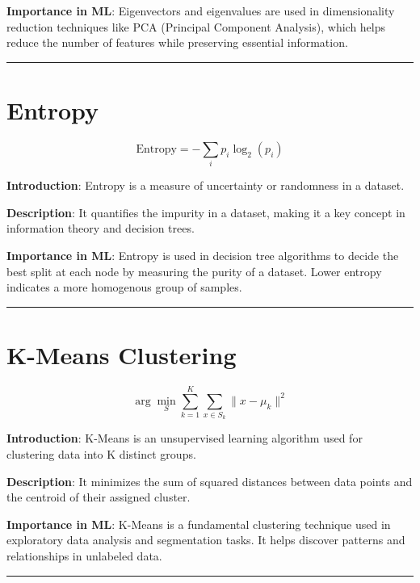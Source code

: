 \documentclass[
  12 pt,
  a4paper,
]{book}
\numberwithin{equation}{section}
\theoremstyle{plain}      %
\theoremstyle{definition} %
\theoremstyle{remark}     %
\theoremstyle{note}         %
\begin{document}
\textbf{Importance in ML}: Eigenvectors and eigenvalues are used in
dimensionality reduction techniques like PCA (Principal Component
Analysis), which helps reduce the number of features while preserving
essential information.

\begin{center}\rule{0.5\linewidth}{0.5pt}\end{center}

\newpage

\hypertarget{entropy}{%
\chapter{Entropy}\label{entropy}}

\[
\text{Entropy} = - \sum_{i} p_i \log_2(p_i)
\]

\textbf{Introduction}: Entropy is a measure of uncertainty or randomness
in a dataset.

\textbf{Description}: It quantifies the impurity in a dataset, making it
a key concept in information theory and decision trees.

\textbf{Importance in ML}: Entropy is used in decision tree algorithms
to decide the best split at each node by measuring the purity of a
dataset. Lower entropy indicates a more homogenous group of samples.

\begin{center}\rule{0.5\linewidth}{0.5pt}\end{center}

\newpage

\hypertarget{k-means-clustering}{%
\chapter{K-Means Clustering}\label{k-means-clustering}}

\[
\arg\min_S \sum_{k=1}^K \sum_{x \in S_k} \|x - \mu_k\|^2
\]

\textbf{Introduction}: K-Means is an unsupervised learning algorithm
used for clustering data into K distinct groups.

\textbf{Description}: It minimizes the sum of squared distances between
data points and the centroid of their assigned cluster.

\textbf{Importance in ML}: K-Means is a fundamental clustering technique
used in exploratory data analysis and segmentation tasks. It helps
discover patterns and relationships in unlabeled data.

\begin{center}\rule{0.5\linewidth}{0.5pt}\end{center}
\end{document}
